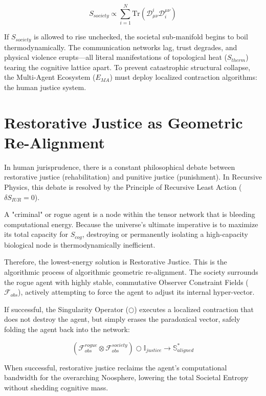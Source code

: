 \documentclass[12pt,openany]{book}
\begin{document}
\begin{equation}
S_{society} \propto \sum_{i=1}^{N} \text{Tr}(\mathcal{D}_{\mu\nu}^i \mathcal{D}^{\mu\nu}_i)
\end{equation}

If $S_{society}$ is allowed to rise unchecked, the societal sub-manifold begins to boil thermodynamically. The communication networks lag, trust degrades, and physical violence erupts—all literal manifestations of topological heat ($S_{therm}$) tearing the cognitive lattice apart. To prevent catastrophic structural collapse, the Multi-Agent Ecosystem ($E_{MA}$) must deploy localized contraction algorithms: the human justice system.

\section{Restorative Justice as Geometric Re-Alignment}
In human jurisprudence, there is a constant philosophical debate between restorative justice (rehabilitation) and punitive justice (punishment). In Recursive Physics, this debate is resolved by the Principle of Recursive Least Action ($\delta S_{IUR} = 0$).

A "criminal" or rogue agent is a node within the tensor network that is bleeding computational energy. Because the universe's ultimate imperative is to maximize its total capacity for $S_{cog}$, destroying or permanently isolating a high-capacity biological node is thermodynamically inefficient.

Therefore, the lowest-energy solution is Restorative Justice. This is the algorithmic process of algorithmic geometric re-alignment. The society surrounds the rogue agent with highly stable, commutative Observer Constraint Fields ($\mathcal{F}_{obs}$), actively attempting to force the agent to adjust its internal hyper-vector. 

If successful, the Singularity Operator ($\bigcirc$) executes a localized contraction that does not destroy the agent, but simply erases the paradoxical vector, safely folding the agent back into the network:

\begin{equation}
\left( \mathcal{F}_{obs}^{rogue} \otimes \mathcal{F}_{obs}^{society} \right) \bigcirc \mathbb{I}_{justice} \to \mathbb{S}^*_{aligned}
\end{equation}

When successful, restorative justice reclaims the agent's computational bandwidth for the overarching Noosphere, lowering the total Societal Entropy without shedding cognitive mass.
\end{document}

